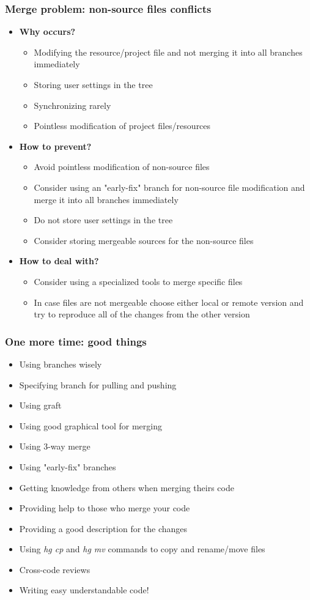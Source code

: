 \documentclass{beamer}
\begin{document}
\begin{frame}
\frametitle{Merge problem: non-source files conflicts}
\begin{itemize}
\item \textbf{Why occurs?}
\begin{itemize}
\item Modifying the resource/project file and not merging it into all branches immediately
\item Storing user settings in the tree
\item Synchronizing rarely
\item Pointless modification of project files/resources
\end{itemize}
\item \textbf{How to prevent?}
\begin{itemize}
\item Avoid pointless modification of non-source files
\item Consider using an "early-fix" branch for non-source file modification and merge it into all branches immediately
\item Do not store user settings in the tree
\item Consider storing mergeable sources for the non-source files
\end{itemize}
\item \textbf{How to deal with?}
\begin{itemize}
\item Consider using a specialized tools to merge specific files
\item In case files are not mergeable choose either local or remote version and try to reproduce all of the changes from the other version
\end{itemize}
\end{itemize}
\end{frame}

\begin{frame}
\frametitle{One more time: good things}
\begin{itemize}
\item Using branches wisely
\item Specifying branch for pulling and pushing
\item Using graft
\item Using good graphical tool for merging
\item Using 3-way merge
\item Using "early-fix" branches
\item Getting knowledge from others when merging theirs code
\item Providing help to those who merge your code
\item Providing a good description for the changes
\item Using \textit{hg cp} and \textit{hg mv} commands to copy and rename/move files
\item Cross-code reviews
\item Writing easy understandable code!
\end{itemize}
\end{frame}
\end{document}
